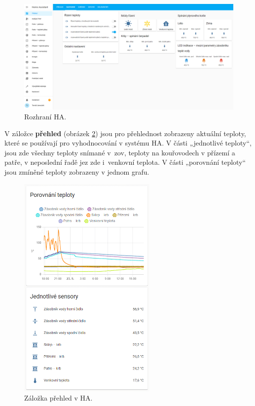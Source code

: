 \begin{figure}[H]
    \centering
    \includegraphics[width=\textwidth]{images/software-ha/prehled-ha.png}
    \caption{Rozhraní HA.}
    \label{fig:prehled-ha}
\end{figure}

V záložce \textbf{přehled} (obrázek \ref{fig:zalozka-prehled}) jsou pro přehlednost zobrazeny aktuální teploty, které se používají pro vyhodnocování v systému HA. V části „jednotlivé teploty“, jsou zde všechny teploty snímané v~\acrshort{zov}, teploty na kouřovodech v přízemí a patře, v neposlední řadě jez zde i~venkovní teplota. V části „porovnání teploty“ jsou zmíněné teploty zobrazeny v jednom grafu.

\begin{figure}[H]
    \centering
    \includegraphics[width=0.6\textwidth]{images/software-ha/zalozka-prehled.png}
    \caption{Záložka přehled v HA.}
    \label{fig:zalozka-prehled}
\end{figure}

